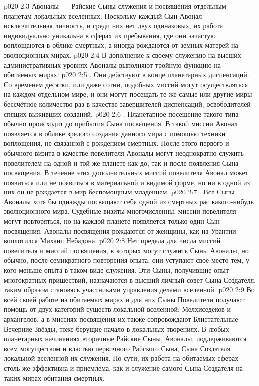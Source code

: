\vs p020 2:3 Авоналы~--- Райские Сыны служения и посвящения отдельным планетам локальных вселенных. Поскольку каждый Сын Авонал~--- исключительная личность, и среди них нет двух одинаковых, их работа индивидуально уникальна в сферах их пребывания, где они зачастую воплощаются в облике смертных, а иногда рождаются от земных матерей на эволюционных мирах.
\vs p020 2:4 \pc В дополнение к своему служению на высших административных уровнях Авоналы выполняют тройную функцию на обитаемых мирах:
\vs p020 2:5 . Они действуют в конце планетарных диспенсаций. Со временем десятки, или даже сотни, подобных миссий могут осуществляться на каждом отдельном мире, и они могут посещать те же самые или другие миры бессчётное количество раз в качестве завершителей диспенсаций, освободителей спящих выживших созданий.
\vs p020 2:6 . Планетарное посещение такого типа обычно происходит до прибытия Сына посвящения. В такой миссии Авонал появляется в облике зрелого создания данного мира с помощью техники воплощения, не связанной с рождением смертных. После этого первого и обычного визита в качестве повелителя Авоналы могут неоднократно служить повелителем на одной и той же планете как до, так и после появления Сына посвящения. В течение этих дополнительных миссий повелителя Авонал может появиться или не появиться в материальной и видимой форме, но ни в одной из них он не рождается в мир беспомощным младенцем.
\vs p020 2:7 . Все Сыны Авоналы хотя бы однажды посвящают себя одной из смертных рас какого\hyp{}нибудь эволюционного мира. Судебные визиты многочисленны, миссии повелителя могут повторяться, но на каждой планете появляется только один Сын посвящения. Авоналы посвящения рождаются от женщины, как на Урантии воплотился Михаил Небадона.
\vs p020 2:8 \pc Нет предела для числа миссий повелителя и миссий посвящения, в которых могут служить Сыны Авоналы, но обычно, после семикратного повторения опыта, они уступают своё место тем, у кого меньше опыта в таком виде служения. Эти Сыны, получившие опыт многократных пришествий, назначаются в высший личный совет Сына Создателя, таким образом становясь участниками управления делами вселенной.
\vs p020 2:9 Во всей своей работе на обитаемых мирах и для них Сыны Повелители получают помощь от двух категорий существ локальной вселенной: Мелхиседеков и архангелов, а в миссиях посвящения их также сопровождают Блистательные Вечерние Звёзды, тоже берущие начало в локальных творениях. В любых планетарных начинаниях вторичные Райские Сыны, Авоналы, поддерживаются всем могуществом и властью первичного Райского Сына, Сына Создателя локальной вселенной их служения. По сути, их работа на обитаемых сферах столь же эффективна и приемлема, как и служение самог\'о Сына Создателя на таких мирах обитания смертных.
